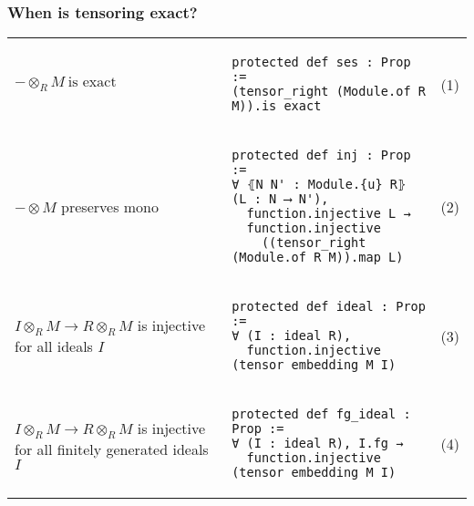 \documentclass[aspectratio=169]{beamer}
\begin{document}
\begin{frame}[fragile]
\frametitle{When is tensoring exact?}

\renewcommand{\arraystretch}{3.5} %
\begin{tabular}{llr}%

\parbox[h]{.27\textwidth}{$-\otimes_R M~\text{is exact}$} &
\begin{lstlisting}
protected def ses : Prop :=
(tensor_right (Module.of R M)).is_exact
\end{lstlisting} & (1)   %
\\

\parbox[h]{.27\textwidth}{$- \otimes M$ preserves mono} & 
\begin{lstlisting}
protected def inj : Prop :=
∀ ⦃N N' : Module.{u} R⦄ (L : N ⟶ N'), 
  function.injective L →
  function.injective 
    ((tensor_right (Module.of R M)).map L)
\end{lstlisting} & (2) 
\\

\parbox[h]{.27\textwidth}{$I\otimes_R M\to R\otimes_R M$ is injective for all ideals $I$} &
\begin{lstlisting}
protected def ideal : Prop :=
∀ (I : ideal R), 
  function.injective (tensor_embedding M I)
\end{lstlisting} & (3)  
\\

\parbox[h]{.27\textwidth}{$I\otimes_R M\to R\otimes_R M$ is injective for all finitely generated ideals $I$} &
\begin{lstlisting}
protected def fg_ideal : Prop :=
∀ (I : ideal R), I.fg → 
  function.injective (tensor_embedding M I)  
\end{lstlisting} & (4) 
\\
\end{tabular}

\end{frame}
\end{document}
